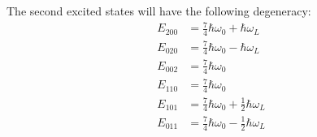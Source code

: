 \documentclass[a4paper,twoside]{article}
\begin{document}
\begin{itemize}
\begin{problem}
            The second excited states will have the following degeneracy:
            \begin{align}
                E_{200} &= \frac{7}{4} \hbar \omega_0 + \hbar \omega_L \\
                E_{020} &= \frac{7}{4} \hbar \omega_0 - \hbar \omega_L \\
                E_{002} &= \frac{7}{4} \hbar \omega_0 \\
                E_{110} &= \frac{7}{4} \hbar \omega_0 \\
                E_{101} &= \frac{7}{4} \hbar \omega_0 + \frac{1}{2} \hbar \omega_L \\
                E_{011} &= \frac{7}{4} \hbar \omega_0 - \frac{1}{2} \hbar \omega_L
            \end{align}
        \end{problem}
\end{itemize}
\end{document}
